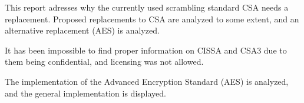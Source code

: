 This report adresses why the currently used scrambling standard CSA needs a 
replacement. Proposed replacements to CSA are analyzed to some extent, and an 
alternative replacement (AES) is analyzed. 

It has been impossible to find proper information on CISSA and CSA3 due to them 
being confidential, and licensing was not allowed.


The implementation of the Advanced Encryption Standard (AES) is analyzed, and the
general implementation is displayed.
